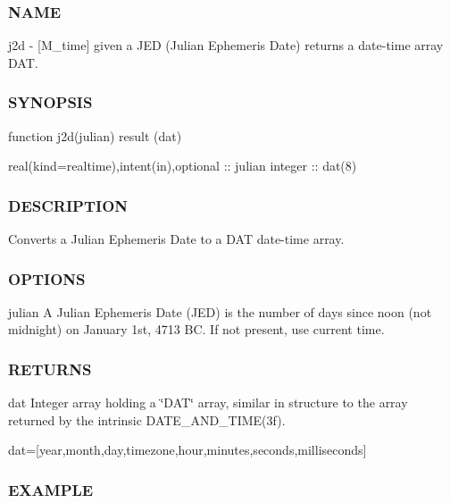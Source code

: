 \begin{DoxyVerb}
\subsubsection*{N\+A\+ME}

j2d -\/ \mbox{[}M\+\_\+time\mbox{]} given a J\+ED (Julian Ephemeris Date) returns a date-\/time array D\+AT. 

\subsubsection*{S\+Y\+N\+O\+P\+S\+IS}

\begin{DoxyVerb}function j2d(julian) result (dat)

 real(kind=realtime),intent(in),optional :: julian
 integer                                 :: dat(8)
\end{DoxyVerb}


\subsubsection*{D\+E\+S\+C\+R\+I\+P\+T\+I\+ON}

\begin{DoxyVerb} Converts a Julian Ephemeris Date to a DAT date-time array.
\end{DoxyVerb}


\subsubsection*{O\+P\+T\+I\+O\+NS}

julian A Julian Ephemeris Date (J\+ED) is the number of days since noon (not midnight) on January 1st, 4713 BC. If not present, use current time.

\subsubsection*{R\+E\+T\+U\+R\+NS}

dat Integer array holding a \char`\"{}\+D\+A\+T\char`\"{} array, similar in structure to the array returned by the intrinsic D\+A\+T\+E\+\_\+\+A\+N\+D\+\_\+\+T\+I\+M\+E(3f).

dat=\mbox{[}year,month,day,timezone,hour,minutes,seconds,milliseconds\mbox{]}

\subsubsection*{E\+X\+A\+M\+P\+LE}


\end{DoxyVerb}
